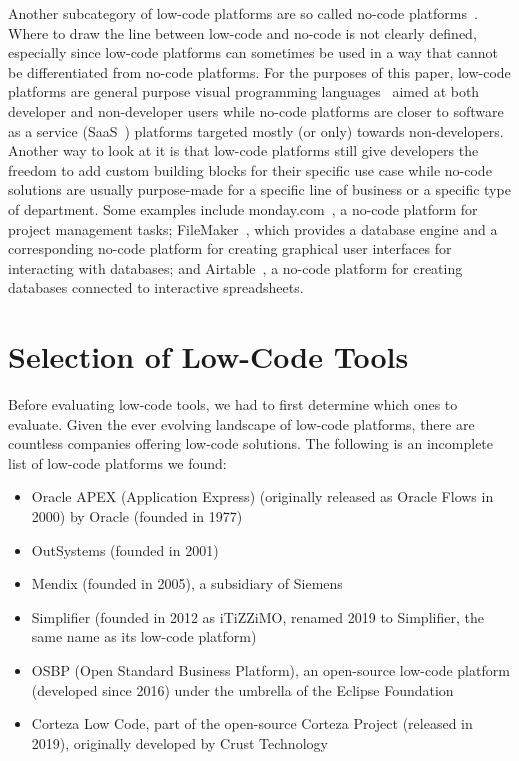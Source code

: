 \documentclass[runningheads]{llncs}
\begin{document}
Another subcategory of low-code platforms are so called no-code platforms~\cite{wiki:no_code_development_platform}. Where to draw the line between low-code and no-code is not clearly defined, especially since low-code platforms can sometimes be used in a way that cannot be differentiated from no-code platforms. For the purposes of this paper, low-code platforms are general purpose visual programming languages~\cite{wiki:visual_programming_language} aimed at both developer and non-developer users while no-code platforms are closer to software as a service (SaaS~\cite{wiki:saas}) platforms targeted mostly (or only) towards non-developers. Another way to look at it is that low-code platforms still give developers the freedom to add custom building blocks for their specific use case while no-code solutions are usually purpose-made for a specific line of business or a specific type of department. Some examples include monday.com~\cite{wiki:monday_com}, a no-code platform for project management tasks; FileMaker~\cite{wiki:filemaker}, which provides a database engine and a corresponding no-code platform for creating graphical user interfaces for interacting with databases; and Airtable~\cite{wiki:airtable}, a no-code platform for creating databases connected to interactive spreadsheets.

\section{Selection of Low-Code Tools}
\label{subsec:selection_of_low_code_tools}

Before evaluating low-code tools, we had to first determine which ones to evaluate. Given the ever evolving landscape of low-code platforms, there are countless companies offering low-code solutions. The following is an incomplete list of low-code platforms we found:

\begin{itemize}
  \item Oracle APEX (Application Express) (originally released as Oracle Flows in 2000) by Oracle (founded in 1977)
  \item OutSystems (founded in 2001)
  \item Mendix (founded in 2005), a subsidiary of Siemens
  \item Simplifier (founded in 2012 as iTiZZiMO, renamed 2019 to Simplifier, the same name as its low-code platform)
  \item OSBP (Open Standard Business Platform), an open-source low-code platform (developed since 2016) under the umbrella of the Eclipse Foundation
  \item Corteza Low Code, part of the open-source Corteza Project (released in 2019), originally developed by Crust Technology
\end{itemize}
\end{document}
